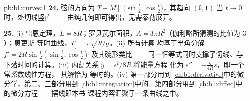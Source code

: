 \begin{solution}{pb:b1:curves:1}
\textbf{24.} 弦的方向为 $T - M \parallel
\bigl(\sin\frac t2, \cos\frac t2\bigr)$，其趋向 $(0, 1)$
当 $t \to 0^{+}$ 时，处切线竖直——
由纯几何即可得出，无需泰勒展开。

\textbf{25.} (i) 雷恩定理，$L = 8R$；罗贝瓦尔面积，$A =
3\pi R^2$（伽利略所猜测的比值为 $3$）；惠更斯
等时曲线，$T_\downarrow = \pi\sqrt{R/g}$。(ii) 所有计算
均基于半角分解 $f' =
2R\sin\frac t2(\sin\frac t2, \cos\frac t2)$ 及其碗形类比
——同一恒等式同时支撑了切线、与
下落时间的计算。(iii) 内蕴关系 $y = s^2/8R$ 将能量方程
化为 $s'' = -\frac{g}{4R}s$，即一个常系数线性方程，
其解恰为
等时的。(iv) 第一部分用到
\cref{ch:b1:derivative}中的微分学，第二、三部分用到
\cref{ch:b1:integration}中的，第四部分用到
\cref{ch:b1:diffeq}中的微分方程——摆线即本书
课程内容汇聚于一条曲线之中。
\end{solution}
